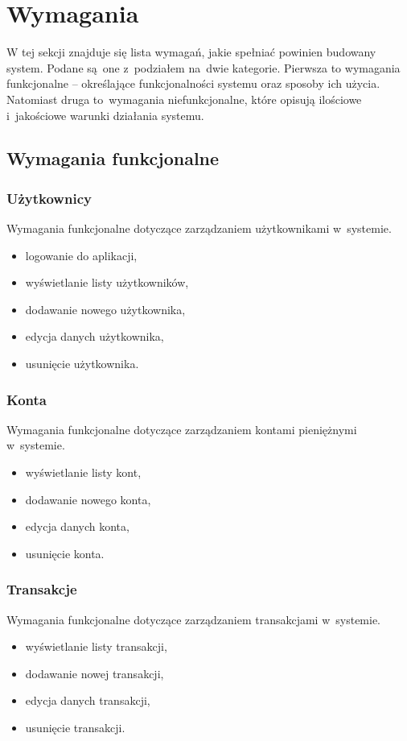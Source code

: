 \section{Wymagania}
W tej sekcji znajduje się lista wymagań, jakie spełniać powinien budowany system. Podane są~one z~podziałem na~dwie kategorie. Pierwsza to wymagania funkcjonalne -- określające funkcjonalności systemu oraz sposoby ich użycia. Natomiast druga to~wymagania niefunkcjonalne, które opisują ilościowe i~jakościowe warunki działania systemu.

\subsection{Wymagania funkcjonalne}
\subsubsection{Użytkownicy}
Wymagania funkcjonalne dotyczące zarządzaniem użytkownikami w~systemie.
\begin{itemize}
  \item logowanie do aplikacji,
  \item wyświetlanie listy użytkowników,
  \item dodawanie nowego użytkownika,
  \item edycja danych użytkownika,
  \item usunięcie użytkownika.
\end{itemize}

\subsubsection{Konta}
Wymagania funkcjonalne dotyczące zarządzaniem kontami pieniężnymi w~systemie.
\begin{itemize}
  \item wyświetlanie listy kont,
  \item dodawanie nowego konta,
  \item edycja danych konta,
  \item usunięcie konta.
\end{itemize}

\subsubsection{Transakcje}
Wymagania funkcjonalne dotyczące zarządzaniem transakcjami w~systemie.
\begin{itemize}
  \item wyświetlanie listy transakcji,
  \item dodawanie nowej transakcji,
  \item edycja danych transakcji,
  \item usunięcie transakcji.
\end{itemize}


